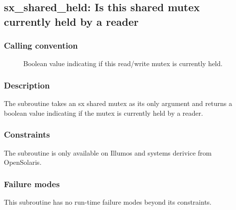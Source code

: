 \clearpage
{}
{}
\label{subr:sx-read-held}
\subsection*{sx\_shared\_held: Is this shared mutex currently held by
  a reader}

\subsubsection*{Calling convention}

\begin{description}
\item[] Boolean value indicating if this read/write
  mutex is currently held.
\end{description}

\subsubsection*{Description}

The  subroutine takes an sx shared mutex as
its only argument and returns a boolean value indicating if the mutex
is currently held by a reader.

\subsubsection*{Constraints}

The  subroutine is only available on Illumos and
systems derivice from OpenSolaris.

\subsubsection*{Failure modes}

This subroutine has no run-time failure modes beyond its constraints.
